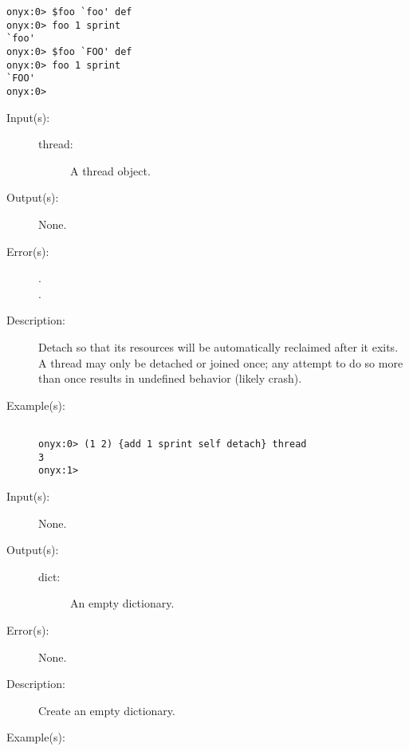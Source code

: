 \begin{description}
\begin{description}
\begin{verbatim}
onyx:0> $foo `foo' def
onyx:0> foo 1 sprint
`foo'
onyx:0> $foo `FOO' def
onyx:0> foo 1 sprint
`FOO'
onyx:0>
		\end{verbatim}
	\end{description}
\label{systemdict:detach}
\item[{\onyxop{thread}{detach}{--}}: ]
	\begin{description}\item[]
	\item[Input(s): ]
		\begin{description}\item[]
		\item[thread: ]
			A thread object.
		\end{description}
	\item[Output(s): ] None.
	\item[Error(s): ]
		\begin{description}\item[]
		\item[.]
		\item[.]
		\end{description}
	\item[Description: ]
		Detach  so that its resources will be
		automatically reclaimed after it exits.  A thread may only be
		detached or joined once; any attempt to do so more than once
		results in undefined behavior (likely crash).
	\item[Example(s): ]\begin{verbatim}

onyx:0> (1 2) {add 1 sprint self detach} thread
3
onyx:1>
		\end{verbatim}
	\end{description}
\label{systemdict:dict}
\item[{\onyxop{--}{dict}{dict}}: ]
	\begin{description}\item[]
	\item[Input(s): ] None.
	\item[Output(s): ]
		\begin{description}\item[]
		\item[dict: ]
			An empty dictionary.
		\end{description}
	\item[Error(s): ] None.
	\item[Description: ]
		Create an empty dictionary.
	\item[Example(s): ]\begin{verbatim}


\end{verbatim}
\end{description}
\end{description}
